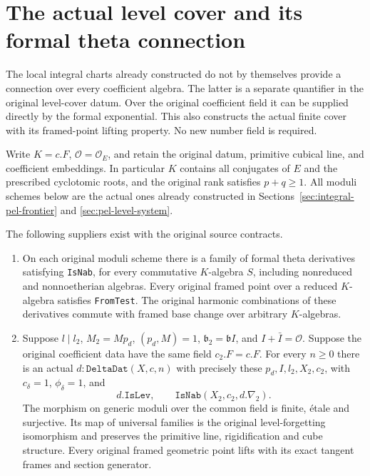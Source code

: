 \section{The actual level cover and its formal theta connection}
\label{sec:actual-level-cover}

The local integral charts already constructed do not by themselves
provide a connection over every coefficient algebra.  The latter is a
separate quantifier in the original level-cover datum.  Over the original
coefficient field it can be supplied directly by the formal exponential.
This also constructs the actual finite cover with its framed-point
lifting property.  No new number field is required.

Write $K=c.F$, $\mathcal O=\mathcal O_E$, and retain the original
datum, primitive cubical line, and coefficient embeddings.  In
particular $K$ contains all conjugates of $E$ and the prescribed
cyclotomic roots, and the original rank satisfies $p+q\ge1$.
All moduli schemes below are the actual ones already
constructed in Sections~\ref{sec:integral-pel-frontier} and
\ref{sec:pel-level-system}.

\begin{theorem}\label{thm:actual-level-cover}
The following suppliers exist with the original source contracts.
\begin{enumerate}
\item On each original moduli scheme there is a family of formal theta
derivatives satisfying \texttt{IsNab}, for every commutative $K$-algebra
$S$, including nonreduced and nonnoetherian algebras.  Every original
framed point over a reduced $K$-algebra satisfies \texttt{FromTest}.
The original harmonic combinations of these derivatives commute with
framed base change over arbitrary $K$-algebras.
\item Suppose $l\mid l_2$, $M_2=M p_d$, $(p_d,M)=1$,
$\mathfrak b_2=\mathfrak b I$, and $I+\bar I=\mathcal O$.
Suppose the original coefficient data have the same field
$c_2.F=c.F$.  For every $n\ge0$ there is an actual
$d:\texttt{DeltaDat}(X,c,n)$ with precisely these $p_d,I,l_2,X_2,c_2$,
with $c_\delta=1$, $\phi_\delta=1$, and
\[
               d.\texttt{IsLev},\qquad
               \texttt{IsNab}(X_2,c_2,d.\nabla_2).
\]
The morphism on generic moduli over the common field is finite,
\'etale and surjective.  Its map of universal families is the original
level-forgetting isomorphism and preserves the primitive line,
rigidification and cube structure.  Every original framed geometric
point lifts with its exact tangent frames and section generator.
\end{enumerate}
\end{theorem}

